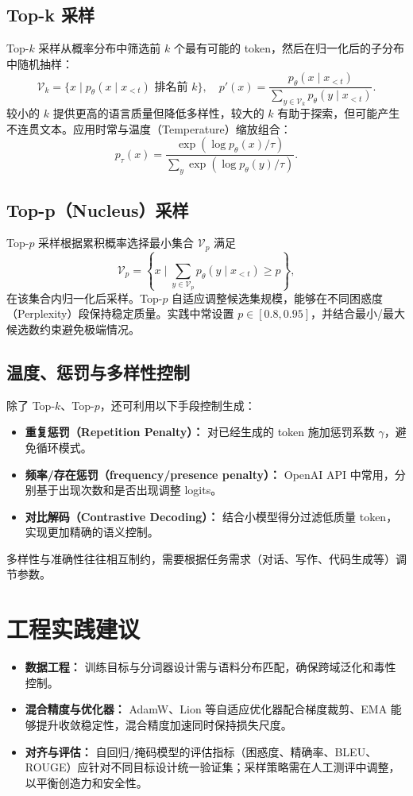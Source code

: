 \documentclass[UTF8,zihao=-4]{ctexart}
\begin{document}
\subsection{Top-k 采样}
Top-$k$ 采样从概率分布中筛选前 $k$ 个最有可能的 token，然后在归一化后的子分布中随机抽样：
\begin{equation}
  \mathcal{V}_k = \{x \mid p_\theta(x \mid x_{<t}) \text{ 排名前 } k\}, \quad
  p'(x) = \frac{p_\theta(x \mid x_{<t})}{\sum_{y \in \mathcal{V}_k} p_\theta(y \mid x_{<t})}.
\end{equation}
较小的 $k$ 提供更高的语言质量但降低多样性，较大的 $k$ 有助于探索，但可能产生不连贯文本。应用时常与温度（Temperature）缩放组合：
\begin{equation}
  p_\tau(x) = \frac{\exp(\log p_\theta(x)/\tau)}{\sum_y \exp(\log p_\theta(y)/\tau)}.
\end{equation}

\subsection{Top-p（Nucleus）采样}
Top-$p$ 采样根据累积概率选择最小集合 $\mathcal{V}_p$ 满足
\begin{equation}
  \mathcal{V}_p = \left\{x \mid \sum_{y \in \mathcal{V}_p} p_\theta(y \mid x_{<t}) \ge p \right\},
\end{equation}
在该集合内归一化后采样。Top-$p$ 自适应调整候选集规模，能够在不同困惑度（Perplexity）段保持稳定质量。实践中常设置 $p \in [0.8, 0.95]$，并结合最小/最大候选数约束避免极端情况。

\subsection{温度、惩罚与多样性控制}
除了 Top-$k$、Top-$p$，还可利用以下手段控制生成：
\begin{itemize}
  \item \textbf{重复惩罚（Repetition Penalty）：} 对已经生成的 token 施加惩罚系数 $\gamma$，避免循环模式。
  \item \textbf{频率/存在惩罚（frequency/presence penalty）：} OpenAI API 中常用，分别基于出现次数和是否出现调整 logits。
  \item \textbf{对比解码（Contrastive Decoding）：} 结合小模型得分过滤低质量 token，实现更加精确的语义控制。
\end{itemize}
多样性与准确性往往相互制约，需要根据任务需求（对话、写作、代码生成等）调节参数。

\section{工程实践建议}
\begin{itemize}
  \item \textbf{数据工程：} 训练目标与分词器设计需与语料分布匹配，确保跨域泛化和毒性控制。
  \item \textbf{混合精度与优化器：} AdamW、Lion 等自适应优化器配合梯度裁剪、EMA 能够提升收敛稳定性，混合精度加速同时保持损失尺度。
  \item \textbf{对齐与评估：} 自回归/掩码模型的评估指标（困惑度、精确率、BLEU、ROUGE）应针对不同目标设计统一验证集；采样策略需在人工测评中调整，以平衡创造力和安全性。
\end{itemize}
\end{document}
